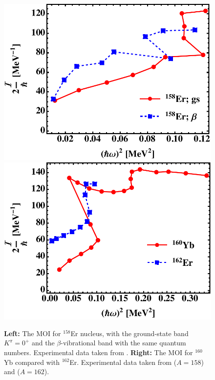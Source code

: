 \begin{figure}
    \centering
    \includegraphics[scale=0.5]{Chapters/Figures/mois_Er158.pdf}
    \includegraphics[scale=0.5]{Chapters/Figures/mois_Yb160Er182.pdf}
    \caption{\textbf{Left:} The MOI for $^{158}$Er nucleus, with the ground-state band $K^\pi=0^+$ and the $\beta$-vibrational band with the same quantum numbers. Experimental data taken from \cite{nica2017nuclear}. \textbf{Right:} The MOI for $^{160}$Yb compared with $^{162}$Er. Experimental data taken from \cite{nica2021nuclear} ($A=158$) and \cite{reich2007nuclear} ($A=162$).}
    \label{fig-ErYbnuclei-mois}
\end{figure}

